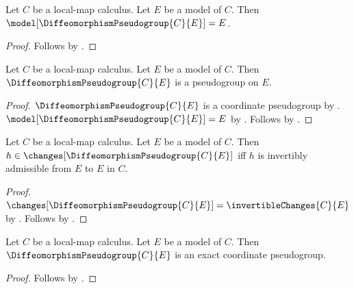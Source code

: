 \begin{theorem}\label{diffeomorphism_pseudogroup_model}
    Let $C$ be a local-map calculus.
    Let $E$ be a model of $C$.
    Then $\model[\DiffeomorphismPseudogroup{C}{E}]=E$.
\end{theorem}
\begin{proof}
    Follows by .
\end{proof}

\begin{classification}\label{diffeomorphism_pseudogroup_on}
    Let $C$ be a local-map calculus.
    Let $E$ be a model of $C$.
    Then $\DiffeomorphismPseudogroup{C}{E}$ is a pseudogroup on $E$.
\end{classification}
\begin{proof}
    $\DiffeomorphismPseudogroup{C}{E}$ is a coordinate pseudogroup by
        .
    $\model[\DiffeomorphismPseudogroup{C}{E}]=E$ by .
    Follows by .
\end{proof}

\begin{theorem}\label{diffeomorphism_pseudogroup_changes}
    Let $C$ be a local-map calculus.
    Let $E$ be a model of $C$.
    Then $h\in\changes[\DiffeomorphismPseudogroup{C}{E}]$ iff
        $h$ is invertibly admissible from $E$ to $E$ in $C$.
\end{theorem}
\begin{proof}
    $\changes[\DiffeomorphismPseudogroup{C}{E}]=\invertibleChanges{C}{E}$ by
        .
    Follows by .
\end{proof}

\begin{theorem}\label{diffeomorphism_pseudogroup_is_exact}
    Let $C$ be a local-map calculus.
    Let $E$ be a model of $C$.
    Then $\DiffeomorphismPseudogroup{C}{E}$ is an exact coordinate pseudogroup.
\end{theorem}
\begin{proof}
    Follows by .
\end{proof}

